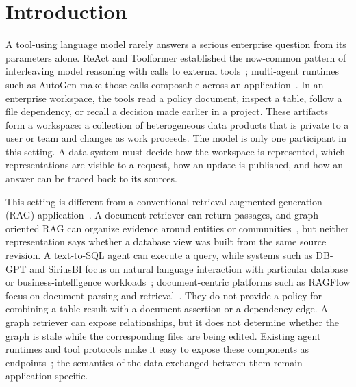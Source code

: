 
\section{Introduction}
\label{sec:intro}

A tool-using language model rarely answers a serious enterprise question from
its parameters alone. ReAct and Toolformer established the now-common pattern
of interleaving model reasoning with calls to external tools~\cite{yao2023react,schick2023toolformer};
multi-agent runtimes such as AutoGen make those calls composable across an
application~\cite{wu2024autogen}. In an enterprise workspace, the tools read a
policy document, inspect a table, follow a file dependency, or recall a
decision made earlier in a project. These artifacts form a workspace: a
collection of heterogeneous data products that is private to a user or team
and changes as work proceeds. The model is only one participant in this
setting. A data system must decide how the workspace is represented, which
representations are visible to a request, how an update is published, and how
an answer can be traced back to its sources.

This setting is different from a conventional retrieval-augmented generation
(RAG) application~\cite{lewis2020rag}. A document retriever can return
passages, and graph-oriented RAG can organize evidence around entities or
communities~\cite{edge2024graphrag}, but neither representation says whether a
database view was built from the same source revision. A text-to-SQL agent can
execute a query, while systems such as DB-GPT and SiriusBI focus on natural
language interaction with particular database or business-intelligence
workloads~\cite{xue2024dbgpt,jiang2025siriusbi}; document-centric platforms such
as RAGFlow focus on document parsing and retrieval~\cite{ragflow2026}. They do
not provide a policy
for combining a table result with a document assertion or a dependency edge.
A graph retriever can expose relationships, but it does not determine whether
the graph is stale while the corresponding files are being edited. Existing
agent runtimes and tool protocols make it easy to expose these components as
endpoints~\cite{wu2024autogen,mcp2025tools}; the semantics of the data exchanged
between them remain application-specific.


